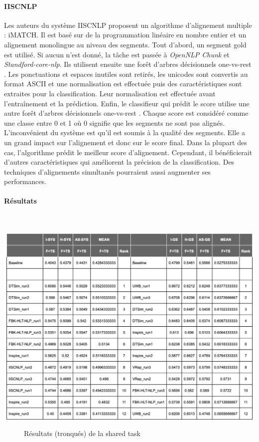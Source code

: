 \documentclass[a4paper, twoside, 11pt]{article}
\begin{document}
        \paragraph{IISCNLP}
        \hfill \break
 Les auteurs du système IISCNLP \cite{tekumalla} proposent un algorithme d’alignement multiple : iMATCH. Il est basé sur de la programmation linéaire en nombre entier et un alignement monolingue au niveau des segments. Tout d’abord, un segment \og gold \fg{} est utilisé. Si aucun n’est donné, la tâche est passée à \textit{OpenNLP Chunk} et \textit{Standford-core-nlp}. Ils utilisent ensuite une forêt d'arbres décisionnels \og one-vs-rest \fg{}. Les ponctuations et espaces inutiles sont retirés, les unicodes sont convertis au format ASCII et une normalisation est effectuée puis des caractéristiques sont extraites pour la classification. Leur normalisation est effectuée avant l’entraînement et la prédiction. Enfin, le classifieur qui prédit le score utilise une autre forêt d'arbres décisionnels \og one-vs-rest \fg{}. Chaque score est considéré comme une classe entre 0 et 1 où 0 signifie que les segments ne sont pas alignés. L’inconvénient du système est qu’il est soumis à la qualité des segments. Elle a un grand impact sur l’alignement et donc sur le score final. Dans la plupart des cas, l’algorithme prédit le meilleur score d’alignement. Cependant, il bénéficierait d’autres caractéristiques qui améliorent la précision de la classification. Des techniques d’alignements simultanés pourraient aussi augmenter ses performances.

 \paragraph{Résultats}\mbox{}\\
\begin{center}
 \includegraphics[width=16cm,angle=0]{truncated_results.png}
\begin{figure}[!h]
\caption{Résultats (tronqués) de la \og shared task \fg{}}
\end{figure}
 \end{center}
\end{document}
